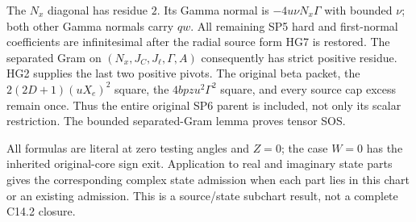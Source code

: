 The $N_x$ diagonal has residue $2$.  Its Gamma normal is
$-4u\nu N_x\Gamma$ with bounded $\nu$; both other Gamma normals
carry $qw$.  All remaining SP5 hard and first-normal coefficients
are infinitesimal after the radial source form HG7 is restored.
The separated Gram on $(N_x,J_C,J_\ell,\Gamma,A)$ consequently has
strict positive residue.  HG2 supplies the last two positive pivots.
The original beta packet, the $2(2D+1)(uX_e)^2$ square, the
$4bpzu^2\Gamma^2$ square, and every source cap excess remain once.
Thus the entire original SP6 parent is included, not only its scalar
restriction.  The bounded separated-Gram lemma proves tensor SOS.

All formulas are literal at zero testing angles and $Z=0$; the
case $W=0$ has the inherited original-core sign exit.  Application
to real and imaginary state parts gives the corresponding complex
state admission when each part lies in this chart or an existing
admission.  This is a source/state subchart result, not a complete
C14.2 closure.
